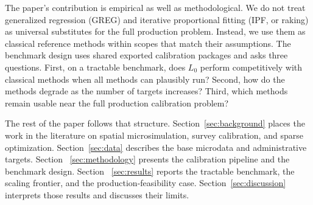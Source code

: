The paper's contribution is empirical as well as methodological. We do not treat generalized
regression (GREG) and iterative proportional fitting (IPF, or raking) as universal substitutes for
the full production problem. Instead, we use them as classical reference methods within scopes that
match their assumptions. The benchmark design uses shared exported calibration packages and asks
three questions. First, on a tractable benchmark, does $L_0$ perform competitively with classical
methods when all methods can plausibly run? Second, how do the methods degrade as the number of
targets increases? Third, which methods remain usable near the full production calibration problem?

The rest of the paper follows that structure. Section~\ref{sec:background} places the work in the
literature on spatial microsimulation, survey calibration, and sparse optimization.
Section~\ref{sec:data} describes the base microdata and administrative targets. Section
~\ref{sec:methodology} presents the calibration pipeline and the benchmark design. Section
~\ref{sec:results} reports the tractable benchmark, the scaling frontier, and the
production-feasibility case. Section~\ref{sec:discussion} interprets those results and discusses
their limits.
